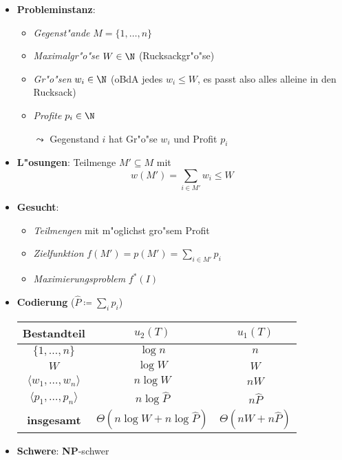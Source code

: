 \begin{itemize}
  \item \textbf{Probleminstanz}:
  \begin{itemize}
    \item \emph{Gegenst"ande} $ M = \{ 1,\dots,n \} $ 
    \item \emph{Maximalgr"o"se} $ W \in \N $ (Rucksackgr"o"se)
    \item \emph{Gr"o"sen} $ w_i \in \N $ (oBdA jedes $ w_i \leq W $, es passt also alles alleine in den Rucksack)
    \item \emph{Profite} $ p_i \in \N $
    \item[$ \leadsto $] Gegenstand $ i $ hat Gr"o"se $ w_i $ und Profit $ p_i $
  \end{itemize}
  \item \textbf{L"osungen}: Teilmenge $ M' \subseteq M $ mit
    \begin{equation*}
      w(M') = \textstyle\sum_{i \in M'}w_i \leq W
    \end{equation*}
  \item \textbf{Gesucht}:
  \begin{itemize}
    \item \emph{Teilmengen} mit m"oglichst gro"sem Profit
    \item \emph{Zielfunktion} $ f(M') = p(M') = \sum_{i \in M'}p_i $
    \item \emph{Maximierungsproblem} $ f^*(I) $
  \end{itemize}
  \item \textbf{Codierung} ($ \hat{P} \coloneqq \sum_i p_i $)
  \begin{center}
    \begin{tabular}{ c c c } 
      \hline    
      Bestandteil & $ u_2(T) $ & $ u_1(T) $ \\
      \hline
      $ \{ 1,\dots,n \} $ & $ \log n $ & $ n $ \\
      $ W $ & $ \log W $ & $ W $ \\
      $ \langle w_1, \dots, w_n \rangle $ & $ n\log W $ & $ nW $ \\
      $ \langle p_1, \dots, p_n \rangle $ & $ n\log \hat{P} $ & $ n \hat{P} $ \\
      \hline
      \textbf{insgesamt} & $ \Theta(n\log W + n\log \hat{P}) $ & $ \Theta(nW + n\hat{P}) $
    \end{tabular}
  \end{center}
  \item \textbf{Schwere}: \textbf{NP}-schwer
  \begin{itemize}

\end{itemize}
\end{itemize}
